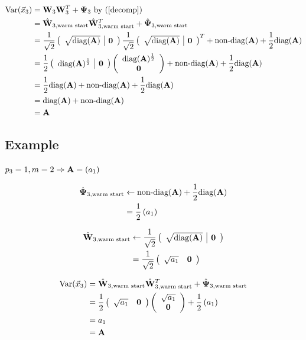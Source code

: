 \begin{align}
  \var(\x_3) &= \W_3 \W_3^T + \bpsi_3  \text{ by (\ref{decomp})} \\
             &= \wwarm \wwarm^T + \psiwarm \\
  &=\wexpandwarm \wexpandwarm^T + \psiexpwarm \\
&=  \frac{1}{2} \left( \begin{array}{c|c}  \text{diag}(\A)
    ^{\frac{1}{2}} & \bold{0}  \end{array} \right) \left( \begin{array}{c}  \text{diag}(\A)
    ^{\frac{1}{2}}\\  \bold{0}  \end{array} \right) +
  \psiexpwarm \\
             &= \frac{1}{2} \text{diag}(\A) + \psiexpwarm \\
             &= \text{diag}(\A) + \text{non-diag}(\A) \\
               &= \A
\end{align}


\subsection{Example}
$p_3 = 1, m = 2 \Rightarrow \A = \left(a_1 \right)$

\begin{align}
  \psiwarm &\leftarrow \psiexpwarm\\
  &= \frac{1}{2} \left(a_1 \right)
\end{align}

\begin{align}
  \wwarm &\leftarrow \wexpandwarm \\
  &= \frac{1}{\sqrt{2}}  \left( \begin{array}{cc} \sqrt{a_1}  &
                                                                 \0 \end{array}
                                                                \right) \\ 
\end{align}

\begin{align}
  \var(\x_3) &= \wwarm \wwarm^T + \psiwarm \\
  &= \frac{1}{2}  \left( \begin{array}{cc} \sqrt{a_1}  &
                                                                 \0 \end{array}
                                                                \right)
                                                                \left(\begin{array}{c}
                                                                       \sqrt{a_1}
                                                                       \\
                                                                       \0 \end{array} \right)
  + \frac{1}{2} \left( a_1 \right) \\
  &= a_1 \\
&= \A
\end{align}



